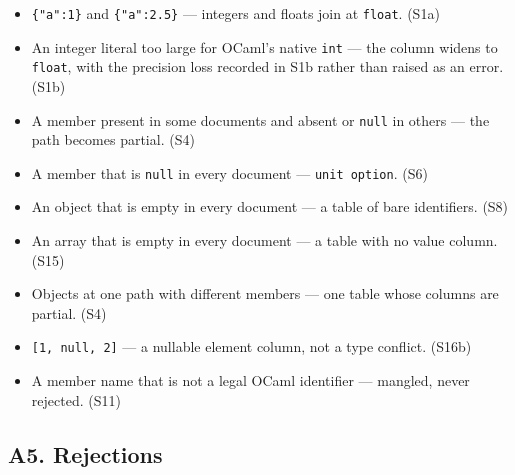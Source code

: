 \begin{itemize}
  \item \texttt{\{"a":1\}} and \texttt{\{"a":2.5\}} --- integers and floats
        join at \texttt{float}. \hfill (S1a)
  \item An integer literal too large for OCaml's native \texttt{int} --- the
        column widens to \texttt{float}, with the precision loss recorded in
        S1b rather than raised as an error. \hfill (S1b)
  \item A member present in some documents and absent or \texttt{null} in
        others --- the path becomes partial. \hfill (S4)
  \item A member that is \texttt{null} in every document ---
        \texttt{unit option}. \hfill (S6)
  \item An object that is empty in every document --- a table of bare
        identifiers. \hfill (S8)
  \item An array that is empty in every document --- a table with no value
        column. \hfill (S15)
  \item Objects at one path with different members --- one table whose columns
        are partial. \hfill (S4)
  \item \texttt{[1, null, 2]} --- a nullable element column, not a type
        conflict. \hfill (S16b)
  \item A member name that is not a legal OCaml identifier --- mangled, never
        rejected. \hfill (S11)
\end{itemize}

\subsection*{A5. Rejections}

